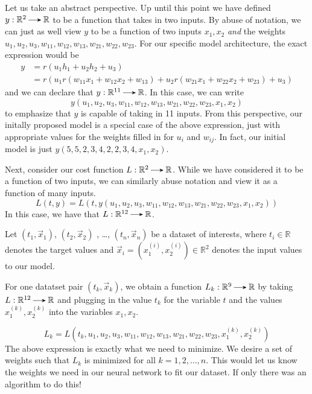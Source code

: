 \documentclass[12pt,letterpaper]{book}
\renewcommand{\to}{\mathbin{\tikz[baseline] \draw[-{Stealth[length=5pt,width=4pt]}] (0pt,.6ex) -- (3.5ex,.6ex);}}
\theoremstyle{definition}
\begin{document}
  Let us take an abstract perspective. Up until this point we have defined $y:\mathbb{R}^2 \to \mathbb{R}$ 
  to be a function that takes in two inputs. By abuse of notation, we can just as well view 
  $y$ to be a function of two inputs $x_1, x_2$ \emph{and} the weights 
  $u_1, u_2, u_3, w_{11}, w_{12}, w_{13}, w_{21}, w_{22}, w_{23}$. For our specific model 
  architecture, the exact expression would be 
  \begin{align}
    y &= r(u_1h_1 + u_2h_2 + u_3) \\
     &= r(u_1r(w_{11}x_1 + w_{12}x_2 + w_{13}) + u_2r(w_{21}x_1 + w_{22}x_2 + w_{23}) + u_3)
  \end{align}
  and we can declare that $y: \mathbb{R}^{11} \to \mathbb{R}$. In this case, we can 
  write 
  \[
    y(u_1, u_2, u_3, w_{11}, w_{12}, w_{13}, w_{21}, w_{22}, w_{23}, x_1, x_2)  
  \]
  to emphasize that $y$ is capable of taking in 11 inputs. 
  From this perspective, our initally proposed model is a special case of the above expression, 
  just with appropriate values for the weights filled in for $u_i$ and $w_{ij}$.
  In fact, our initial model is just $y(5, 5, 2, 3, 4, 2, 2, 3, 4, x_1, x_2)$.

  Next, consider our cost function $L: \mathbb{R}^2 \to \mathbb{R}$. While we have considered it to be 
  a function of two inputs, we can similarly abuse notation and view it as a function of 
  many inputs.
  \[
    L(t, y) = L(t, y(u_1, u_2, u_3, w_{11}, w_{12}, w_{13}, w_{21}, w_{22}, w_{23}, x_1, x_2))
  \]
  In this case, we have that $L: \mathbb{R}^{12} \to \mathbb{R}$. 

  Let $(t_1, \vec{x}_1)$, $(t_2, \vec{x}_2)$ , \dots , $(t_n, \vec{x}_n)$ 
  be a dataset of interests, where $t_i \in \mathbb{R}$ denotes the target values and 
  $\vec{x}_i = (x_1^{(i)}, x_2^{(i)})\in \mathbb{R}^2$ denotes the input values to our model.

  For one datatset pair $(t_k, \vec{x}_k)$, we obtain a function 
  $L_k: \mathbb{R}^9 \to \mathbb{R}$ by taking $L: \mathbb{R}^{12} \to \mathbb{R}$ and 
  plugging in the value $t_k$ for the variable $t$ and 
  the values $x^{(k)}_1, x^{(k)}_2$ into the variables $x_1, x_2$.  
  
  \[  
      L_k = L(t_k, u_1, u_2, u_3, w_{11}, w_{12}, w_{13}, w_{21}, w_{22}, w_{23}, x^{(k)}_1, x^{(k)}_2)
  \]
  The above expression is exactly what we need to minimize. We desire a set of weights 
  such that $L_k$ is minimized for all $k = 1, 2, \dots, n$. This would let us know the weights 
  we need in our neural network to fit our dataset. If only there was an algorithm to do this!
\end{document}
